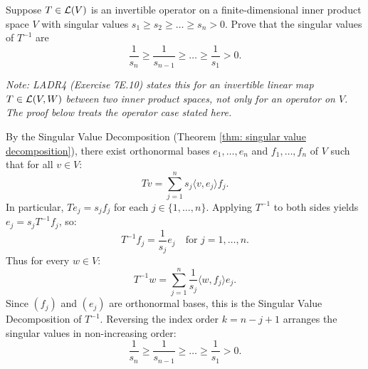 \begin{xrcs}
  Suppose $T \in \mathcal{L}(V)$ is an invertible operator on a finite-dimensional inner product space $V$ with singular values $s_1 \geq s_2 \geq \dots \geq s_n > 0$. Prove that the singular values of $T^{-1}$ are
  \begin{equation}
    \frac{1}{s_n} \ge \frac{1}{s_{n-1}} \ge \dots \ge \frac{1}{s_1} > 0.
  \end{equation}

  \emph{Note: LADR4 (Exercise 7E.10) states this for an invertible linear map $T \in \mathcal{L}(V,W)$ between two inner product spaces, not only for an operator on $V$. The proof below treats the operator case stated here.}

\begin{xprf}
  By the Singular Value Decomposition (Theorem \ref{thm: singular value decomposition}), there exist orthonormal bases $e_1, \dots, e_n$ and $f_1, \dots, f_n$ of $V$ such that for all $v \in V$:
  \[
    Tv = \sum_{j=1}^n s_j \langle v, e_j \rangle f_j.
  \]
  In particular, $T e_j = s_j f_j$ for each $j \in \{1, \dots, n\}$.
  Applying $T^{-1}$ to both sides yields $e_j = s_j T^{-1} f_j$, so:
  \[
    T^{-1} f_j = \frac{1}{s_j} e_j \quad \text{for } j = 1, \dots, n.
  \]
  Thus for every $w \in V$:
  \[
    T^{-1} w = \sum_{j=1}^n \frac{1}{s_j} \langle w, f_j \rangle e_j.
  \]
  Since $(f_j)$ and $(e_j)$ are orthonormal bases, this is the Singular Value Decomposition of $T^{-1}$.
  Reversing the index order $k = n - j + 1$ arranges the singular values in non-increasing order:
  \[
    \frac{1}{s_n} \ge \frac{1}{s_{n-1}} \ge \dots \ge \frac{1}{s_1} > 0.
  \]
\end{xprf}
\end{xrcs}
